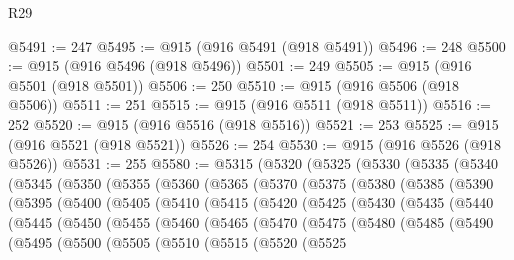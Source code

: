 \begin{lexlean}{R29}
\begin{coremodule}
@5491 := 247
@5495 := @915 (@916 @5491 (@918 @5491))
@5496 := 248
@5500 := @915 (@916 @5496 (@918 @5496))
@5501 := 249
@5505 := @915 (@916 @5501 (@918 @5501))
@5506 := 250
@5510 := @915 (@916 @5506 (@918 @5506))
@5511 := 251
@5515 := @915 (@916 @5511 (@918 @5511))
@5516 := 252
@5520 := @915 (@916 @5516 (@918 @5516))
@5521 := 253
@5525 := @915 (@916 @5521 (@918 @5521))
@5526 := 254
@5530 := @915 (@916 @5526 (@918 @5526))
@5531 := 255
@5580 := @5315
    (@5320
      (@5325
        (@5330
          (@5335
            (@5340
              (@5345
                (@5350
                  (@5355
                    (@5360
                      (@5365
                        (@5370
                          (@5375
                            (@5380
                              (@5385
                                (@5390
                                  (@5395
                                    (@5400
                                      (@5405
                                        (@5410
                                          (@5415
                                            (@5420
                                              (@5425
                                                (@5430
                                                  (@5435
                                                    (@5440
                                                      (@5445
                                                        (@5450
                                                          (@5455
                                                            (@5460
                                                              (@5465
                                                                (@5470
                                                                  (@5475
                                                                    (@5480
                                                                      (@5485
                                                                        (@5490
                                                                          (@5495
                                                                            (@5500
                                                                              (@5505
                                                                                (@5510
                                                                                  (@5515
                                                                                    (@5520
                                                                                      (@5525

\end{coremodule}
\end{lexlean}
